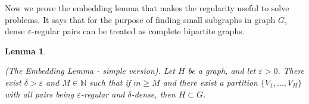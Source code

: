 \documentclass[12pt,twoside,a4paper,bibliography=totocnumbered]{book}
\numberwithin{equation}{section}
\newtheorem{lemma}     	[theorem] {Lemma}
\newtheorem{definition}	[theorem] {Definition}
\theoremstyle{remark}
\begin{document}
Now we prove the embedding lemma that makes the regularity useful to solve problems. It says that for the purpose of finding small subgraphs in graph $G$, dense $\varepsilon$-regular pairs can be treated as complete bipartite graphs.


\begin{lemma}\label{lemma:embeddinglemma}


(The Embedding Lemma - simple version). Let $H$ be a graph, and let $\varepsilon >0$. There exist $\delta >\varepsilon$ and $M \in \mathbb{N}$ such that if $m \geq M$ and there exist a partition $\{V_1, ..., V_H\}$ with all pairs being $\varepsilon$-regular and $\delta$-dense, then $H \subset G$. 
\end{lemma} 
\end{document}
